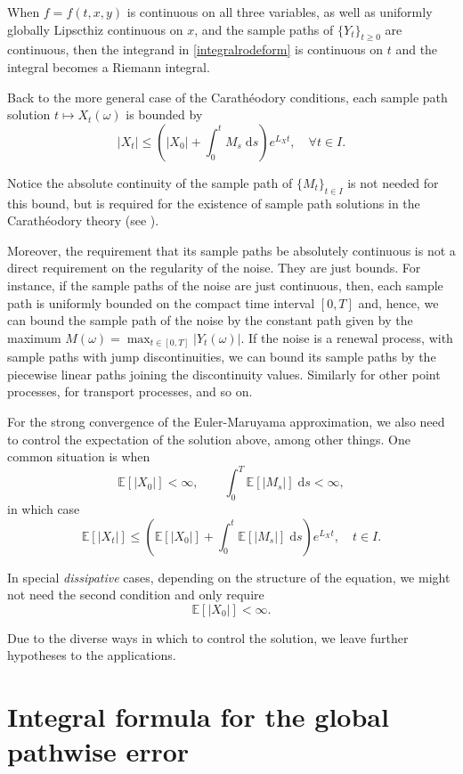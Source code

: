 \documentclass[reqno,12pt]{amsart}
\theoremstyle{plain}%
\theoremstyle{definition}
\begin{document}
When $f=f(t, x, y)$ is continuous on all three variables, as well as uniformly globally Lipscthiz continuous on $x$, and the sample paths of $\{Y_t\}_{t\geq 0}$ are continuous, then the integrand in \eqref{integralrodeform} is continuous on $t$ and the integral becomes a Riemann integral.

Back to the more general case of the Carath\'eodory conditions, each sample path solution $t \mapsto X_t(\omega)$ is bounded by
\[
    |X_t| \leq \left(|X_0| + \int_0^t M_s\;\mathrm{d}s\right) e^{L_X t}, \quad \forall t\in I.
\]

Notice the absolute continuity of the sample path of $\{M_t\}_{t\in I}$ is not needed for this bound, but is required for the existence of sample path solutions in the Carath\'eodory theory (see \cite[Theorem 2.3]{HanKloeden2017}).

Moreover, the requirement that its sample paths be absolutely continuous is not a direct requirement on the regularity of the noise. They are just bounds. For instance, if the sample paths of the noise are just continuous, then, each sample path is uniformly bounded on the compact time interval $[0, T]$ and, hence, we can bound the sample path of the noise by the constant path given by the maximum $M(\omega) = \max_{t\in [0, T]}|Y_t(\omega)|$. If the noise is a renewal process, with sample paths with jump discontinuities, we can bound its sample paths by the piecewise linear paths joining the discontinuity values. Similarly for other point processes, for transport processes, and so on.

For the strong convergence of the Euler-Maruyama approximation, we also need to control the expectation of the solution above, among other things. One common situation is when
\[
    \mathbb{E}[|X_0|] < \infty, \qquad \int_0^T \mathbb{E}[|M_s|] \;\mathrm{d}s < \infty,
\]
in which case
\[
    \mathbb{E}[|X_t|] \leq \left(\mathbb{E}[|X_0|] + \int_0^t \mathbb{E}[|M_s|]\;\mathrm{d}s\right) e^{L_X t}, \quad t\in I.
\]

In special \emph{dissipative} cases, depending on the structure of the equation, we might not need the second condition and only require
\[
    \mathbb{E}[|X_0|] < \infty.
\]

Due to the diverse ways in which to control the solution, we leave further hypotheses to the applications.

\section{Integral formula for the global pathwise error}
\end{document}
